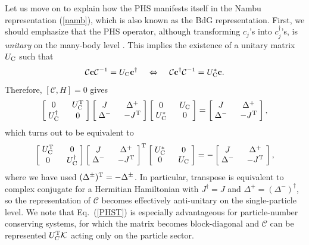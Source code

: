 \documentclass{tADP2e}
\theoremstyle{plain}
\theoremstyle{plain}
\theoremstyle{definition}
\begin{document}
\begin{appendices}
Let us move on to explain how the PHS manifests itself in the Nambu representation (\ref{namb}), which is also known as the BdG representation. First, we should emphasize that the PHS operator, although transforming $c_j$'s into $c_j^\dag$'s, is \emph{unitary} on the many-body level \cite{CCK16}. This implies the existence of a unitary matrix $U_{\rm C}$ such that
\begin{equation}
\mathcal{C}\bold{c}\mathcal{C}^{-1}=U_{\rm C}\bold{c}^\dag\;\;\;\;\Leftrightarrow\;\;\;\;
\mathcal{C}\bold{c}^\dag\mathcal{C}^{-1}=U_{\rm C}^*\bold{c}.
\end{equation}
Therefore, $[\mathcal{C},H]=0$ gives
\begin{equation}
\begin{bmatrix} \;0\; & \;U_{\rm C}^{\rm T}\; \\ \;U_{\rm C}^\dag\; & \;0\;  \end{bmatrix}  
\begin{bmatrix} \;J\; & \;\Delta^+\; \\ \;\Delta^-\; & \;-J^{\rm T}\; \end{bmatrix}
\begin{bmatrix} \;0\; & \;U_{\rm C}\; \\ \;U_{\rm C}^*\; & \;0\;  \end{bmatrix}
=\begin{bmatrix} \;J\; & \;\Delta^+\; \\ \;\Delta^-\; & \;-J^{\rm T}\; \end{bmatrix},
\end{equation}
which turns out to be equivalent to
\begin{equation}
\begin{bmatrix}  \;U_{\rm C}^{\rm T}\; & \;0\; \\  \;0\; & \;U_{\rm C}^\dag\; \end{bmatrix}  
\begin{bmatrix} \;J\; & \;\Delta^+\; \\ \;\Delta^-\; & \;-J^{\rm T}\; \end{bmatrix}^{\rm T}
\begin{bmatrix}  \;U_{\rm C}^*\; & \;0\; \\  \;0\; & \;U_{\rm C}\; \end{bmatrix} 
=-\begin{bmatrix} \;J\; & \;\Delta^+\; \\ \;\Delta^-\; & \;-J^{\rm T}\; \end{bmatrix},
\label{PHST}
\end{equation}
where we have used $(\Delta^\pm)^{\rm T}=-\Delta^\pm$. In particular, transpose is equivalent to complex conjugate for a Hermitian Hamiltonian with $J^\dag=J$ and $\Delta^+=(\Delta^-)^\dag$, so the representation of $\mathcal{C}$ becomes effectively anti-unitary on the single-particle level. We note that Eq.~(\ref{PHST}) is especially advantageous for particle-number conserving systems, for which the matrix becomes block-diagonal and $\mathcal{C}$ can be represented $U_C^{\rm T}\mathcal{K}$ acting only on the particle sector.


\end{appendices}
\end{document}
